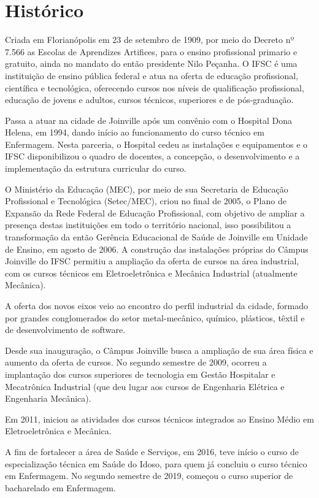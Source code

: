 \section{Histórico}
Criada em Florianópolis em 23 de setembro de 1909, por meio do Decreto nº 7.566 as Escolas de Aprendizes Artifices, para o ensino profissional primario e gratuito, ainda no mandato do então presidente Nilo Peçanha. O IFSC é uma instituição de ensino pública federal e atua na oferta de educação profissional, científica e tecnológica, oferecendo cursos nos níveis de qualificação profissional, educação de jovens e adultos, cursos técnicos, superiores e de pós-graduação.

Passa a atuar na cidade de Joinville após um convênio com o Hospital Dona Helena, em 1994, dando início ao funcionamento do curso técnico em Enfermagem. Nesta parceria, o Hospital cedeu as instalações e equipamentos e o IFSC disponibilizou o quadro de docentes, a concepção, o desenvolvimento e a implementação da estrutura curricular do curso.

O Ministério da Educação (MEC), por meio de sua Secretaria de Educação Profissional e Tecnológica (Setec/MEC), criou no final de 2005, o Plano de Expansão da Rede Federal de Educação Profissional, com objetivo de ampliar a presença destas instituições em todo o território nacional, isso possibilitou a transformação da então Gerência Educacional de Saúde de Joinville em Unidade de Ensino, em agosto de 2006. A construção das instalações próprias do Câmpus Joinville do IFSC permitiu a ampliação da oferta de cursos na área industrial, com os cursos técnicos em Eletroeletrônica e Mecânica Industrial (atualmente Mecânica).

A oferta dos novos eixos veio ao encontro do perfil industrial da cidade, formado por grandes conglomerados do setor metal-mecânico, químico, plásticos, têxtil e de desenvolvimento de software.

Desde sua inauguração, o Câmpus Joinville busca a ampliação de sua área física e aumento da oferta de cursos. No segundo semestre de 2009, ocorreu a implantação dos cursos superiores de tecnologia em Gestão Hospitalar e Mecatrônica Industrial (que deu lugar aos cursos de Engenharia Elétrica e Engenharia Mecânica).

Em 2011, iniciou as atividades dos cursos técnicos integrados ao Ensino Médio em Eletroeletrônica e Mecânica.

A fim de fortalecer a área de Saúde e Serviços, em 2016, teve início o curso de especialização técnica em Saúde do Idoso, para quem já concluiu o curso técnico em Enfermagem. No segundo semestre de 2019, começou o curso superior de bacharelado em Enfermagem.


